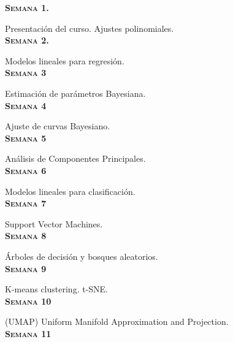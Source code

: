 \documentclass[letterpaper,10pt,onecolumn]{article}
\begin{document}

\noindent\textbf{\textsc{Semana 1.}} 

Presentaci\'on del curso. Ajustes polinomiales. 
\\[-0.3cm] %

\noindent\textbf{\textsc{Semana 2.}} 

Modelos lineales para regresi\'on. 
\\[-0.3cm] %

\noindent\textbf{\textsc{Semana 3}}

Estimaci\'on de par\'ametros Bayesiana.
\\[-0.3cm] %

\noindent\textbf{\textsc{Semana 4}}

Ajuste de curvas Bayesiano.
\\[-0.3cm] %

\noindent\textbf{\textsc{Semana 5}}

An\'alisis de Componentes Principales.
\\[-0.3cm] %

\noindent\textbf{\textsc{Semana 6}}

Modelos lineales para clasificaci\'on.
\\[-0.3cm] %

\noindent\textbf{\textsc{Semana 7}}

Support Vector Machines.
\\[-0.3cm] %

\noindent\textbf{\textsc{Semana 8}}

\'Arboles de decisi\'on y bosques aleatorios.
\\[-0.3cm] %

\noindent\textbf{\textsc{Semana 9}}

K-means clustering. t-SNE.
\\[-0.3cm]

\noindent\textbf{\textsc{Semana 10}}

(UMAP) Uniform Manifold Approximation and Projection.
\\[-0.3cm]


\noindent\textbf{\textsc{Semana 11}}
\end{document}
